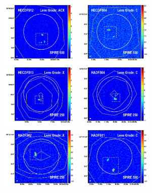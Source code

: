 \documentclass[iop]{emulateapj}
\begin{document}
\begin{figure}[!tbp]
\begin{centering}
\includegraphics[width=0.331\textwidth]{../Figures/overlays/HECDFS12_870_500.pdf}
\includegraphics[width=0.331\textwidth]{../Figures/overlays/HECDFS04_870_500.pdf}
\includegraphics[width=0.331\textwidth]{../Figures/overlays/HECDFS13_870_250.pdf}
\includegraphics[width=0.331\textwidth]{../Figures/overlays/HADFS04_870_250.pdf}
\includegraphics[width=0.331\textwidth]{../Figures/overlays/HADFS02_870_250.pdf}
\includegraphics[width=0.331\textwidth]{../Figures/overlays/HADFS11_870_500.pdf}

\end{centering}
\end{figure}
\end{document}
